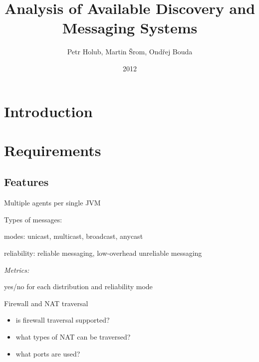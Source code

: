 \documentclass[a4paper]{report}
\title{Analysis of Available Discovery and Messaging Systems}
\author{Petr Holub, Martin Šrom, Ondřej Bouda}
\date{2012}
\newenvironment{metrics}{\par\emph{Metrics:}\begin{compactitem}}{\end{compactitem}}
\begin{document}
\maketitle

\tableofcontents


\chapter{Introduction}



\chapter{Requirements}

\section{Features}

\begin{itemize}

\item Multiple agents per single JVM

\item Types of messages:

\begin{compactitem}

\item modes: unicast, multicast, broadcast, anycast

\item reliability: reliable messaging, low-overhead unreliable messaging

\end{compactitem}

\begin{metrics}

\item yes/no for each distribution and reliability mode

\end{metrics}

\item Firewall and NAT traversal

\begin{itemize}

\item is firewall traversal supported?

\item what types of NAT can be traversed?

\item what ports are used?

\end{itemize}



\end{itemize}
\end{document}
